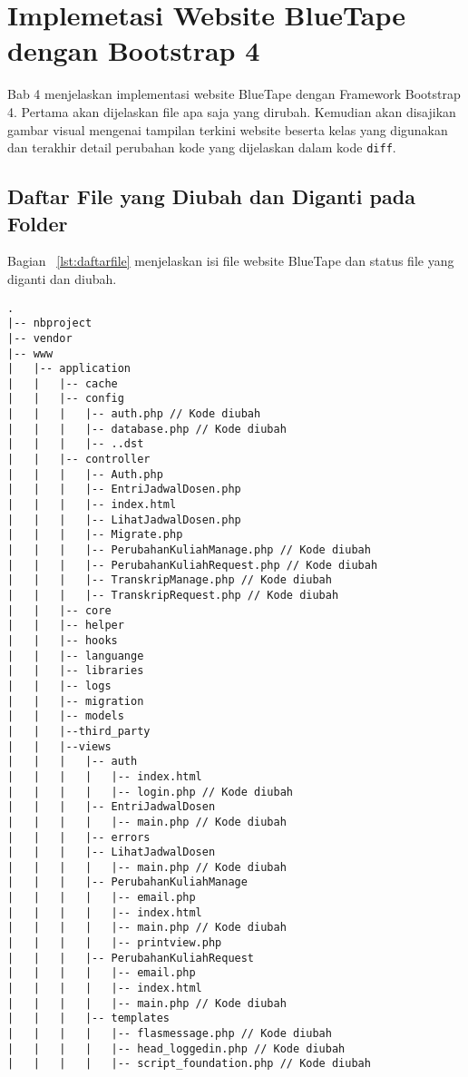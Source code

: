 \chapter{Implemetasi Website BlueTape dengan Bootstrap 4}
Bab 4 menjelaskan implementasi website BlueTape dengan Framework Bootstrap 4. Pertama akan dijelaskan file apa saja yang dirubah. Kemudian akan disajikan gambar visual mengenai tampilan terkini website beserta kelas yang digunakan dan terakhir detail perubahan kode yang dijelaskan dalam kode \texttt{diff}.
\section{Daftar File yang Diubah dan Diganti pada Folder}
Bagian ~\ref{lst:daftarfile} menjelaskan isi file website BlueTape dan status file yang diganti dan diubah.
\begin{lstlisting}[basicstyle=\ttfamily, frame=single, caption=Perubahan isi folder BlueTape,
columns=fullflexible, keepspaces=true, breaklines=true, label={lst:daftarfile}]
.
|-- nbproject
|-- vendor
|-- www
|   |-- application
|   |   |-- cache
|   |   |-- config
|   |   |   |-- auth.php // Kode diubah
|   |   |   |-- database.php // Kode diubah
|   |   |   |-- ..dst
|   |   |-- controller
|   |   |   |-- Auth.php
|   |   |   |-- EntriJadwalDosen.php
|   |   |   |-- index.html
|   |   |   |-- LihatJadwalDosen.php
|   |   |   |-- Migrate.php
|   |   |   |-- PerubahanKuliahManage.php // Kode diubah
|   |   |   |-- PerubahanKuliahRequest.php // Kode diubah
|   |   |   |-- TranskripManage.php // Kode diubah
|   |   |   |-- TranskripRequest.php // Kode diubah
|   |   |-- core
|   |   |-- helper
|   |   |-- hooks
|   |   |-- languange
|   |   |-- libraries
|   |   |-- logs
|   |   |-- migration
|   |   |-- models
|   |   |--third_party
|   |   |--views
|   |   |   |-- auth
|   |   |   |   |-- index.html
|   |   |   |   |-- login.php // Kode diubah
|   |   |   |-- EntriJadwalDosen
|   |   |   |   |-- main.php // Kode diubah
|   |   |   |-- errors
|   |   |   |-- LihatJadwalDosen
|   |   |   |   |-- main.php // Kode diubah
|   |   |   |-- PerubahanKuliahManage
|   |   |   |   |-- email.php
|   |   |   |   |-- index.html
|   |   |   |   |-- main.php // Kode diubah
|   |   |   |   |-- printview.php
|   |   |   |-- PerubahanKuliahRequest
|   |   |   |   |-- email.php
|   |   |   |   |-- index.html
|   |   |   |   |-- main.php // Kode diubah
|   |   |   |-- templates
|   |   |   |   |-- flasmessage.php // Kode diubah
|   |   |   |   |-- head_loggedin.php // Kode diubah
|   |   |   |   |-- script_foundation.php // Kode diubah

\end{lstlisting}
